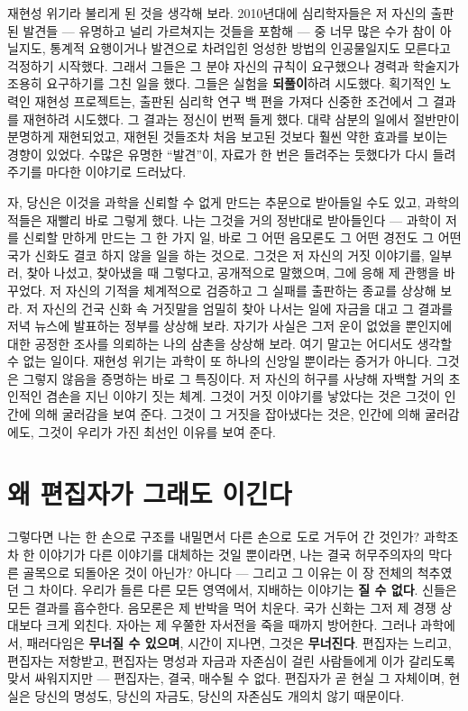 재현성 위기라 불리게 된 것을 생각해 보라. 2010년대에 심리학자들은 저 자신의 출판된 발견들 — 유명하고 널리 가르쳐지는 것들을 포함해 — 중 너무 많은 수가 참이 아닐지도, 통계적 요행이거나 발견으로 차려입힌 엉성한 방법의 인공물일지도 모른다고 걱정하기 시작했다. 그래서 그들은 그 분야 자신의 규칙이 요구했으나 경력과 학술지가 조용히 요구하기를 그친 일을 했다. 그들은 실험을 \textbf{되풀이}하려 시도했다. 획기적인 노력인 재현성 프로젝트는, 출판된 심리학 연구 백 편을 가져다 신중한 조건에서 그 결과를 재현하려 시도했다. 그 결과는 정신이 번쩍 들게 했다. 대략 삼분의 일에서 절반만이 분명하게 재현되었고, 재현된 것들조차 처음 보고된 것보다 훨씬 약한 효과를 보이는 경향이 있었다. 수많은 유명한 ``발견''이, 자료가 한 번은 들려주는 듯했다가 다시 들려주기를 마다한 이야기로 드러났다.

자, 당신은 이것을 과학을 신뢰할 수 없게 만드는 추문으로 받아들일 수도 있고, 과학의 적들은 재빨리 바로 그렇게 했다. 나는 그것을 거의 정반대로 받아들인다 — 과학이 저를 신뢰할 만하게 만드는 그 한 가지 일, 바로 그 어떤 음모론도 그 어떤 경전도 그 어떤 국가 신화도 결코 하지 않을 일을 하는 것으로. 그것은 저 자신의 거짓 이야기를, 일부러, 찾아 나섰고, 찾아냈을 때 그렇다고, 공개적으로 말했으며, 그에 응해 제 관행을 바꾸었다. 저 자신의 기적을 체계적으로 검증하고 그 실패를 출판하는 종교를 상상해 보라. 저 자신의 건국 신화 속 거짓말을 엄밀히 찾아 나서는 일에 자금을 대고 그 결과를 저녁 뉴스에 발표하는 정부를 상상해 보라. 자기가 사실은 그저 운이 없었을 뿐인지에 대한 공정한 조사를 의뢰하는 나의 삼촌을 상상해 보라. 여기 말고는 어디서도 생각할 수 없는 일이다. 재현성 위기는 과학이 또 하나의 신앙일 뿐이라는 증거가 아니다. 그것은 그렇지 않음을 증명하는 바로 그 특징이다. 저 자신의 허구를 사냥해 자백할 거의 초인적인 겸손을 지닌 이야기 짓는 체계. 그것이 거짓 이야기를 낳았다는 것은 그것이 인간에 의해 굴러감을 보여 준다. 그것이 그 거짓을 잡아냈다는 것은, 인간에 의해 굴러감에도, 그것이 우리가 가진 최선인 이유를 보여 준다.

\section*{왜 편집자가 그래도 이긴다}

그렇다면 나는 한 손으로 구조를 내밀면서 다른 손으로 도로 거두어 간 것인가? 과학조차 한 이야기가 다른 이야기를 대체하는 것일 뿐이라면, 나는 결국 허무주의자의 막다른 골목으로 되돌아온 것이 아닌가? 아니다 — 그리고 그 이유는 이 장 전체의 척추였던 그 차이다. 우리가 들른 다른 모든 영역에서, 지배하는 이야기는 \textbf{질 수 없다}. 신들은 모든 결과를 흡수한다. 음모론은 제 반박을 먹어 치운다. 국가 신화는 그저 제 경쟁 상대보다 크게 외친다. 자아는 제 우쭐한 자서전을 죽을 때까지 방어한다. 그러나 과학에서, 패러다임은 \textbf{무너질 수 있으며}, 시간이 지나면, 그것은 \textbf{무너진다}. 편집자는 느리고, 편집자는 저항받고, 편집자는 명성과 자금과 자존심이 걸린 사람들에게 이가 갈리도록 맞서 싸워지지만 — 편집자는, 결국, 매수될 수 없다. 편집자가 곧 현실 그 자체이며, 현실은 당신의 명성도, 당신의 자금도, 당신의 자존심도 개의치 않기 때문이다.

